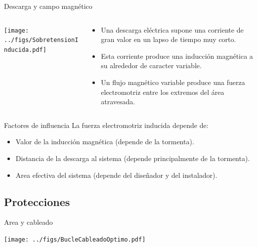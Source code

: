 \documentclass[aspectratio=169, usenames,svgnames,dvipsnames]{beamer}
\begin{document}
\begin{frame}[label={sec:org79d1111},plain]{Descarga y campo magnético}
\begin{columns}
\begin{column}{0.4\columnwidth}
\begin{center}
\texttt{[image: ../figs/SobretensionInducida.pdf]}
\end{center}
\end{column}
\begin{column}{0.6\columnwidth}
\begin{itemize}
\item Una descarga eléctrica supone una \alert{corriente de gran valor} en un lapso de \alert{tiempo muy corto}.

\item Esta corriente produce una \alert{inducción magnética} a su alrededor de caracter \alert{variable}.

\item Un flujo magnético variable produce una \alert{fuerza electromotriz} entre los extremos del área atravesada.
\end{itemize}
\end{column}
\end{columns}
\end{frame}

\begin{frame}[label={sec:org22608b7}]{Factores de influencia}
La fuerza electromotriz inducida depende de:

\begin{itemize}
\item \alert{Valor de la inducción magnética} (depende de la tormenta).

\item \alert{Distancia} de la descarga al sistema (depende principalmente de la
tormenta).

\item \alert{Area efectiva del sistema} (depende del diseñador y del instalador).
\end{itemize}
\end{frame}

\subsection{Protecciones}
\label{sec:orgf7c2b16}


\begin{frame}[label={sec:orgf0cf5ef}]{Area y cableado}
\begin{center}
\texttt{[image: ../figs/BucleCableadoOptimo.pdf]}
\end{center}
\end{frame}
\end{document}
